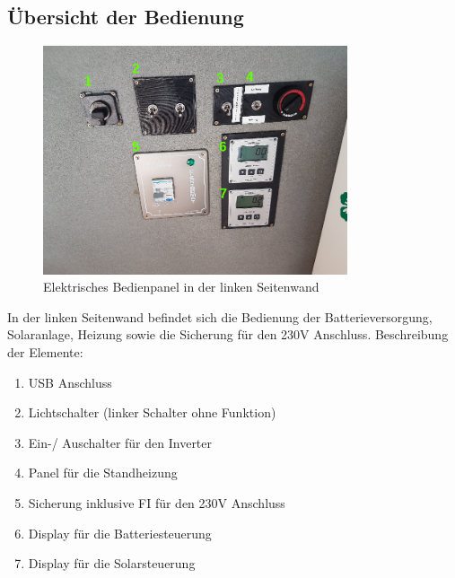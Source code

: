 \subsection{Übersicht der Bedienung}
\begin{figure}[H]
	\centering
    \includegraphics[width=0.8\textwidth]{../Bilder/Anleitung/Bedienung.png}
	\caption{Elektrisches Bedienpanel in der linken Seitenwand}
    \label{Bedienpanel}
\end{figure}

In der linken Seitenwand befindet sich die Bedienung der Batterieversorgung, Solaranlage, Heizung sowie die Sicherung für den 230V Anschluss.
Beschreibung der Elemente:

\begin{enumerate}
    \item USB Anschluss
    \item Lichtschalter (linker Schalter ohne Funktion)
    \item Ein-/ Auschalter für den Inverter
    \item Panel für die Standheizung
    \item Sicherung inklusive FI für den 230V Anschluss
    \item Display für die Batteriesteuerung
    \item Display für die Solarsteuerung
\end{enumerate}

